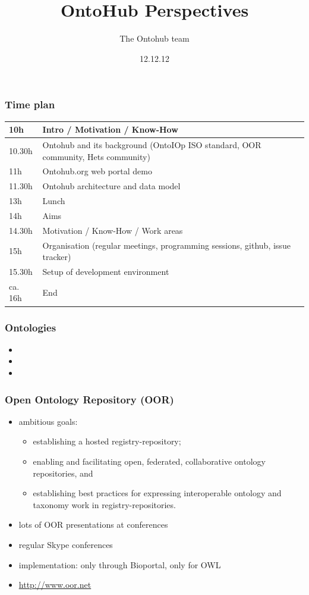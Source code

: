 \documentclass[german]{beamer}
\title{OntoHub Perspectives}
\author{The Ontohub team}
\date{12.12.12}
\begin{document}
\maketitle

\begin{frame}
\frametitle{Time plan}
\begin{tabular}{|l|p{9cm}|}\hline
10h & Intro / Motivation / Know-How\\\hline
10.30h & Ontohub and its background (OntoIOp ISO standard, OOR community, Hets community)\\\hline
11h & Ontohub.org web portal demo\\\hline
11.30h & Ontohub architecture and data model\\\hline
13h & Lunch\\\hline
14h & Aims\\\hline
14.30h & Motivation / Know-How / Work areas\\\hline
15h & Organisation (regular meetings, programming sessions, github, issue tracker)\\\hline
15.30h & Setup of development environment\\\hline
ca. 16h & End\\\hline
\end{tabular}
\end{frame}

\begin{frame}
\frametitle{Ontologies}
\begin{itemize}
\item 
\item 
\item 
\end{itemize}
\end{frame}

\begin{frame}
\frametitle{Open Ontology Repository (OOR)}
\begin{itemize}
\item ambitious goals:
\begin{itemize}
\item establishing a hosted registry-repository;
\item enabling and facilitating open, federated, collaborative ontology repositories, and
\item establishing best practices for expressing interoperable ontology and taxonomy work in registry-repositories.
\end{itemize}
\item lots of OOR presentations at conferences
\item regular Skype conferences
\item implementation: only through Bioportal, only for OWL
\item \url{http://www.oor.net}
\end{itemize}
\end{frame}
\end{document}
